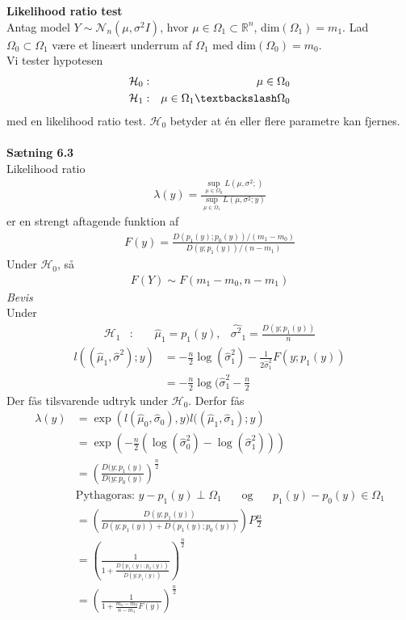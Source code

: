 \documentclass[12pt,a4paper]{report}
\author{Frederik Appel Vardinghus-Nielsen}
\begin{document}
\noindent\textbf{Likelihood ratio test}\\
Antag model $Y\sim\mathcal{N}_n(\mu,\sigma^2I)$, hvor $\mu\in\Omega_1\subset\mathbb{R}^n$, dim$(\Omega_1)=m_1$. Lad $\Omega_0\subset\Omega_1$ være et lineært underrum af $\Omega_1$ med dim$(\Omega_0)=m_0$.\\
Vi tester hypotesen
\begin{align*}
\mathcal{H}_0&:&\mu\in\Omega_0\\
\mathcal{H}_1&:&\mu\in\Omega_1\textbackslash\Omega_0
\end{align*}
med en likelihood ratio test. $\mathcal{H}_0$ betyder at én eller flere parametre kan fjernes.\\\\
\textbf{Sætning 6.3}\\
Likelihood ratio
\begin{align*}
\lambda(y)=\frac{\underset{\mu\in\Omega_0}\sup L(\mu,\sigma^2;)}{\underset{\mu\in\Omega_1}\sup L(\mu,\sigma^2;y)}
\end{align*}
er en strengt aftagende funktion af
\begin{align*}
F(y)=\frac{D(p_1(y);p_0(y))/(m_1-m_0)}{D(y;p_1(y))/(n-m_1)}
\end{align*}
Under $\mathcal{H}_0$, så
\begin{align*}
F(Y)\sim F(m_1-m_0,n-m_1)
\end{align*}
\textit{Bevis}\\
Under
\begin{align*}
\mathcal{H}_1&:\phantom{mm}\hat{\mu}_1=p_1(y),&\hat{\sigma^2}_1=\frac{D(y;p_1(y))}{n}
\end{align*}
\begin{align*}
l((\hat{\mu}_1,\hat{\sigma}^2);y)&=-\frac{n}{2}\log(\hat{\sigma}_1^2)-\frac{1}{2\hat{\sigma}_1^2}F(y;p_1(y))\\
&=-\frac{n}{2}\log(\hat{\sigma}^2_1-\frac{n}{2}
\end{align*}
Der fås tilsvarende udtryk under $\mathcal{H}_0$. Derfor fås
\begin{align*}
\lambda(y)&=\exp\left(l(\hat{\mu}_0,\hat{\sigma}_0),y)l((\hat{\mu}_1,\hat{\sigma}_1);y\right)\\
&=\exp\left(-\frac{n}{2}(\log(\hat{\sigma}^2_0)-\log(\hat{\sigma}^2_1))\right)\\
&=\left(\frac{D(y;p_1(y)}{D(y;p_0(y)}\right)^{\frac{n}{2}}\\
&\text{Pythagoras: }y-p_1(y)\perp\Omega_1\phantom{mm}\text{og}\phantom{mm}p_1(y)-p_0(y)\in\Omega_1\\
&=\left(\frac{D(y;p_1(y))}{D(y;p_1(y))+D(p_1(y);p_0(y))}\right)P{\frac{n}{2}}\\
&=\left(\frac{1}{1+\frac{D(p_1(y);p_0(y))}{D(y;p_1(y))}}\right)^{\frac{n}{2}}\\
&=\left(\frac{1}{1+\frac{m_1-m_0}{n-m_1}F(y)}\right)^{\frac{n}{2}}
\end{align*}
\end{document}
